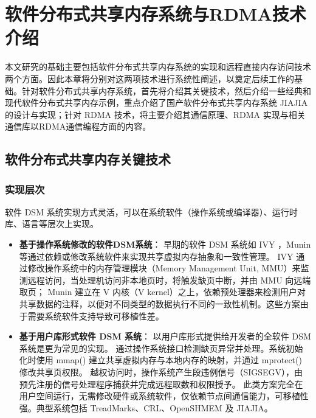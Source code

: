 \chapter{软件分布式共享内存系统与RDMA技术介绍}\label{chap:sdsm}{
    本文研究的基础主要包括软件分布式共享内存系统的实现和远程直接内存访问技术两个方面。因此本章将分别对这两项技术进行系统性阐述，以奠定后续工作的基础。针对软件分布式共享内存系统，首先将介绍其关键技术，然后介绍一些经典和现代软件分布式共享内存示例，重点介绍了国产软件分布式共享内存系统 JIAJIA 的设计与实现；针对 RDMA 技术，将主要介绍其通信原理、RDMA 实现与相关通信库以RDMA通信编程方面的内容。
    \section{软件分布式共享内存关键技术}

    \subsection{实现层次}\label{sec:implementations}
    软件 DSM 系统实现方式灵活，可以在系统软件（操作系统或编译器）、运行时库、语言等层次上实现。
    \begin{itemize}
        \item \textbf{基于操作系统修改的软件DSM系统}：
              早期的软件 DSM 系统如 IVY\citep{likai1988ivy} ，Munin\citep{bennett1990munin}等通过依赖或修改系统软件来实现共享虚拟内存抽象和一致性管理。
              IVY 通过修改操作系统中的内存管理模块（Memory Management Unit, MMU）来监测远程访问，当处理机访问非本地页时，将触发缺页中断，并由 MMU 向远端取页；
              Munin 建立在 V 内核（V kernel）之上，依赖预处理器来检测用户对共享数据的注释，以便对不同类型的数据执行不同的一致性机制。这些方案由于需要系统软件支持导致可移植性差。

        \item \textbf{基于用户库形式软件 DSM 系统}：
              以用户库形式提供给开发者的全软件 DSM 系统是更为常见的实现。
              通过操作系统接口检测缺页异常并处理。系统初始化时使用 mmap() 建立共享虚拟内存与本地内存的映射，并通过 mprotect() 修改共享页权限。
              越权访问时，操作系统产生段违例信号（SIGSEGV），由预先注册的信号处理程序捕获并完成远程取数和权限授予。
              此类方案完全在用户空间运行，无需修改硬件或系统软件，仅依赖节点间通信能力，可移植性强。典型系统包括 TreadMarks、CRL、OpenSHMEM 及 JIAJIA。


\end{itemize}}
